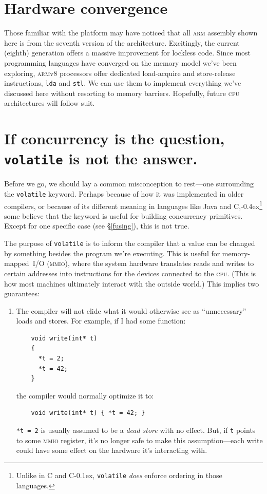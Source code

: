 \documentclass[fontsize=10pt, numbers=endperiod]{scrartcl}
\newcommand{\codesize}{\fontsize{10pt}{12pt}}
\newcommand{\punckern}{\kern-0.4ex}
\newcommand{\monobox}[1]{\mbox{\texttt{#1}}}
\newcommand{\keyword}[1]{\monobox{\color{darkGreen}#1}}
\newcommand{\cpp}[1]{C\kern-0.1ex\raisebox{0.15ex}{\texttt{++}}{\addfontfeature{Numbers=LowercaseOff}#1}}
\newcommand{\clang}[1]{C{\addfontfeature{Numbers=LowercaseOff}#1}}
\newcommand{\csharp}{C\raisebox{0.25ex}{\#}}
\newcommand{\introduce}[1]{\textit{#1}}
\newcommand{\secref}[1]{\hyperref[#1]{\textsc{\S}\ref*{#1}}}
\newenvironment{colfigure}
  {\par\vspace{1\baselineskip minus 0.5\baselineskip}\noindent\minipage{\linewidth}}
  {\endminipage\vspace*{1\baselineskip minus 0.7\baselineskip}}
\begin{document}
\begin{multicols*}{2}
\section{Hardware convergence}

Those familiar with the platform may have noticed that all \textsc{arm} assembly
shown here is from the seventh version of the architecture.
Excitingly, the current (eighth) generation offers a massive
improvement for lockless code.
Since most programming languages have converged on the memory model we've been
exploring, \textsc{arm}v8 processors offer dedicated load-acquire
and store-release instructions, \keyword{lda} and \keyword{stl}.
We can use them to implement everything we've discussed here without
resorting to memory barriers.
Hopefully, future \textsc{cpu} architectures will follow suit.

\section{If concurrency is the question, \texttt{volatile} is not the answer.}

Before we go, we should lay a common misconception to rest---one surrounding
the \keyword{volatile} keyword.
Perhaps because of how it was implemented in older compilers,
or because of its different meaning in languages like
Java and \csharp,\punckern\footnote{Unlike in \clang{} and \cpp{},
\keyword{volatile} \emph{does} enforce ordering in those languages.}
some believe that the keyword is useful for building concurrency primitives.
Except for one specific case (see \secref{fusing}), this is not true.

The purpose of \keyword{volatile} is to inform the compiler that a value can
be changed by something besides the program we're executing.
This is useful for memory-mapped~\textsc{I/O} \textsc{(mmio)},
where the system hardware translates reads and writes to certain addresses
into instructions for the devices connected to the \textsc{cpu}.
(This is how most machines ultimately interact with the outside world.)
This implies two guarantees:
\begin{enumerate}
\item The compiler will not elide what it would otherwise see as ``unnecessary''
    loads and stores. For example, if I had some function:
    \begin{colfigure}
    \begin{verbatim}
    void write(int* t)
    {
      *t = 2;
      *t = 42;
    }
    \end{verbatim}
    \end{colfigure}
    the compiler would normally optimize it to:
    \begin{verbatim}
    void write(int* t) { *t = 42; }
    \end{verbatim}
    \texttt{*t = 2} is usually assumed to be a
    \introduce{dead store} with no effect.
    But, if \texttt{t} points to some \textsc{mmio} register, it's no longer
    safe to make this assumption---each write could have some effect
    on the hardware it's interacting with.


\end{enumerate}
\end{multicols*}
\end{document}
